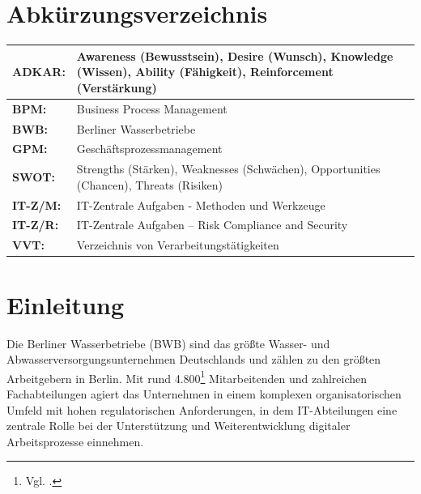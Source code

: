 \documentclass[
    12pt, 
    a4paper,
    ]{scrartcl} %
\begin{document}
\newpage
\section*{Abkürzungsverzeichnis}  
\vspace{0.6cm}
\begin{tabular}{p{4cm} p{11.35cm}}   
    \textbf{\normalsize ADKAR:} & \normalsize Awareness (Bewusstsein), Desire (Wunsch), Knowledge (Wissen), Ability (Fähigkeit), Reinforcement (Verstärkung) \\[0.5cm]
    \hline
    \textbf{\normalsize BPM:} & \normalsize Business Process Management \\[0.5cm]
    \hline
    \textbf{\normalsize BWB:} & \normalsize Berliner Wasserbetriebe \\[0.5cm]
    \hline
    \textbf{\normalsize GPM:} & \normalsize Geschäftsprozessmanagement \\[0.5cm]
    \hline 
    \textbf{\normalsize SWOT:} & \normalsize Strengths (Stärken), Weaknesses (Schwächen), Opportunities (Chancen), Threats (Risiken) \\[0.5cm]
    \hline 
    \textbf{\normalsize IT-Z/M:} & \normalsize IT-Zentrale Aufgaben - Methoden und Werkzeuge \\[0.5cm]
    \hline
    \textbf{\normalsize IT-Z/R:} & \normalsize IT-Zentrale Aufgaben – Risk Compliance and Security \\[0.5cm]
    \hline
    \textbf{\normalsize VVT:} & \normalsize Verzeichnis von Verarbeitungstätigkeiten \\[0.5cm]
 \end{tabular}

\newpage
{} %
\setcounter{page}{1}
\section{Einleitung}
Die Berliner Wasserbetriebe (BWB) sind das größte Wasser- und Abwasserversorgungsunternehmen Deutschlands und zählen zu den größten Arbeitgebern in Berlin. Mit rund 4.800\footnote{Vgl. \cite{BWB_Arbeitgeber}.} Mitarbeitenden und zahlreichen Fachabteilungen agiert das Unternehmen in einem komplexen organisatorischen Umfeld mit hohen regulatorischen Anforderungen, in dem IT-Abteilungen eine zentrale Rolle bei der Unterstützung und Weiterentwicklung digitaler Arbeitsprozesse einnehmen.
\end{document}
